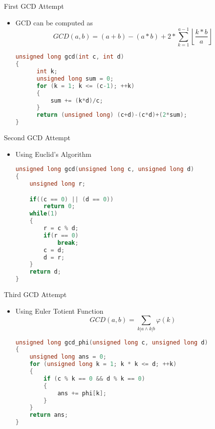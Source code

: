 \documentclass{beamer}
\begin{document}
\begin{frame}[fragile]{First GCD Attempt}
  \begin{itemize}
  \item GCD can be computed as
    \begin{equation*}
      \boxed{GCD(a, b) = (a+b) - (a*b) + 2*\sum_{k = 1}^{a - 1}{\left\lfloor\frac{k*b}{a}\right\rfloor}}
    \end{equation*}
    \begin{lstlisting}[language=C, basicstyle=\footnotesize\ttfamily]
unsigned long gcd(int c, int d)
{
      int k;
      unsigned long sum = 0;
      for (k = 1; k <= (c-1); ++k)
      {
          sum += (k*d)/c;
      }
      return (unsigned long) (c+d)-(c*d)+(2*sum);
}
    \end{lstlisting}
  \end{itemize}
\end{frame}

\begin{frame}[fragile]{Second GCD Attempt}
  \begin{itemize}
  \item Using Euclid's Algorithm
    \begin{lstlisting}[language=C, basicstyle=\footnotesize\ttfamily]
unsigned long gcd(unsigned long c, unsigned long d)
{
    unsigned long r;

    if((c == 0) || (d == 0))
        return 0;
    while(1)
    {
        r = c % d;
        if(r == 0)
            break;
        c = d;
        d = r;
    }
    return d;
}
    \end{lstlisting}
  \end{itemize}
\end{frame}

\begin{frame}[fragile]{Third GCD Attempt}
  \begin{itemize}
  \item Using Euler Totient Function
    \begin{equation*}
      \boxed{GCD(a, b) = \sum_{k|a \wedge k|b}{\varphi(k)}}
    \end{equation*}
    \begin{lstlisting}[language=C, basicstyle=\footnotesize\ttfamily]
unsigned long gcd_phi(unsigned long c, unsigned long d)
{
    unsigned long ans = 0;
    for (unsigned long k = 1; k * k <= d; ++k)
    {
        if (c % k == 0 && d % k == 0)
        {
            ans += phi[k];
        }
    }
    return ans;
}
    \end{lstlisting}
  \end{itemize}
\end{frame}
\end{document}

